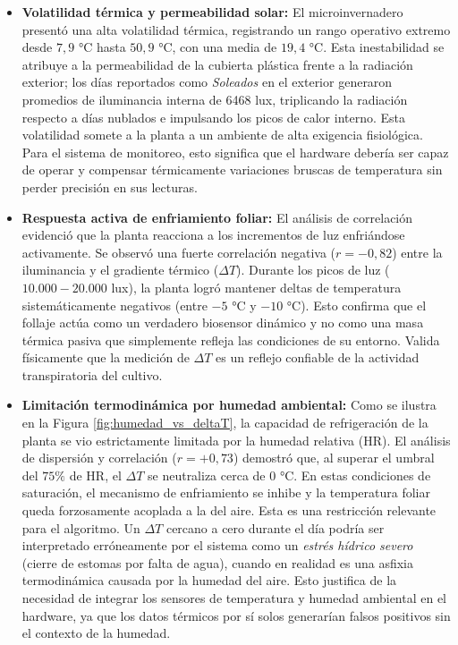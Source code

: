 \begin{itemize}
    \item \textbf{Volatilidad térmica y permeabilidad solar:} El microinvernadero presentó una alta volatilidad térmica, registrando un rango operativo extremo desde $7,9$ °C hasta $50,9$ °C, con una media de $19,4$ °C. Esta inestabilidad se atribuye a la permeabilidad de la cubierta plástica frente a la radiación exterior; los días reportados como \textit{Soleados} en el exterior generaron promedios de iluminancia interna de 6468 lux, triplicando la radiación respecto a días nublados e impulsando los picos de calor interno. Esta volatilidad somete a la planta a un ambiente de alta exigencia fisiológica. Para el sistema de monitoreo, esto significa que el hardware debería ser capaz de operar y compensar térmicamente variaciones bruscas de temperatura sin perder precisión en sus lecturas.
    
    \item \textbf{Respuesta activa de enfriamiento foliar:} El análisis de correlación evidenció que la planta reacciona a los incrementos de luz enfriándose activamente. Se observó una fuerte correlación negativa ($r = -0,82$) entre la iluminancia y el gradiente térmico ($\Delta T$). Durante los picos de luz ($10.000 - 20.000$ lux), la planta logró mantener deltas de temperatura sistemáticamente negativos (entre $-5$ °C y $-10$ °C). Esto confirma que el follaje actúa como un verdadero biosensor dinámico y no como una masa térmica pasiva que simplemente refleja las condiciones de su entorno. Valida físicamente que la medición de $\Delta T$ es un reflejo confiable de la actividad transpiratoria del cultivo.
    
    \item \textbf{Limitación termodinámica por humedad ambiental:} Como se ilustra en la Figura \ref{fig:humedad_vs_deltaT}, la capacidad de refrigeración de la planta se vio estrictamente limitada por la humedad relativa (HR). El análisis de dispersión y correlación ($r = +0,73$) demostró que, al superar el umbral del $75\%$ de HR, el $\Delta T$ se neutraliza cerca de $0$ °C. En estas condiciones de saturación, el mecanismo de enfriamiento se inhibe y la temperatura foliar queda forzosamente acoplada a la del aire. Esta es una restricción relevante para el algoritmo. Un $\Delta T$ cercano a cero durante el día podría ser interpretado erróneamente por el sistema como un \textit{estrés hídrico severo } (cierre de estomas por falta de agua), cuando en realidad es una asfixia termodinámica causada por la humedad del aire. Esto justifica de la necesidad de integrar los sensores de temperatura y humedad ambiental en el hardware, ya que los datos térmicos por sí solos generarían falsos positivos sin el contexto de la humedad.
    

\end{itemize}

